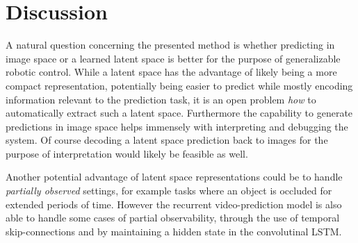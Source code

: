 \section{Discussion}
A natural question concerning the presented method is whether predicting in image space or a learned latent space is better for the purpose of generalizable robotic control.
While a latent space has the advantage of likely being a more compact representation, potentially being easier to predict while mostly encoding information relevant to the prediction task, it is an open problem \emph{how} to automatically extract such a latent space. Furthermore the capability to generate predictions in image space helps immensely with interpreting and debugging the system. Of course decoding a latent space prediction back to images for the purpose of interpretation would likely be feasible as well. 

Another potential advantage of latent space representations could be to handle \emph{partially observed} settings, for example tasks where an object is occluded for extended periods of time. However the recurrent video-prediction model is also able to handle some cases of partial observability, through the use of temporal skip-connections and by maintaining a hidden state in the convolutinal LSTM.


